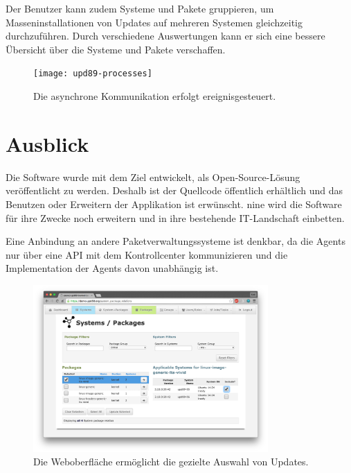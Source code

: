 Der Benutzer kann zudem Systeme und Pakete gruppieren, um Masseninstallationen von Updates auf mehreren Systemen gleichzeitig durchzuführen. Durch verschiedene Auswertungen kann er sich eine bessere Übersicht über die Systeme und Pakete verschaffen.

\begin{figure}
  \centering
    \texttt{[image: upd89-processes]}
  \caption{Die asynchrone Kommunikation erfolgt ereignisgesteuert.}
  \label{fig:processes}
\end{figure}

\section*{Ausblick}

Die Software wurde mit dem Ziel entwickelt, als Open-Source-Lösung veröffentlicht zu werden. Deshalb ist der Quellcode öffentlich erhältlich und das Benutzen oder Erweitern der Applikation ist erwünscht. \gls{nine} wird die Software für ihre Zwecke noch erweitern und in ihre bestehende IT-Landschaft einbetten.

Eine Anbindung an andere Paketverwaltungssysteme ist denkbar, da die Agents nur über eine API mit dem Kontrollcenter kommunizieren und die Implementation der Agents davon unabhängig ist.

\begin{figure}
  \centering
    \includegraphics[width=0.8\textwidth]{screenshot_comboview}
  \caption{Die Weboberfläche ermöglicht die gezielte Auswahl von Updates.}
  \label{fig:userinterface}
\end{figure}